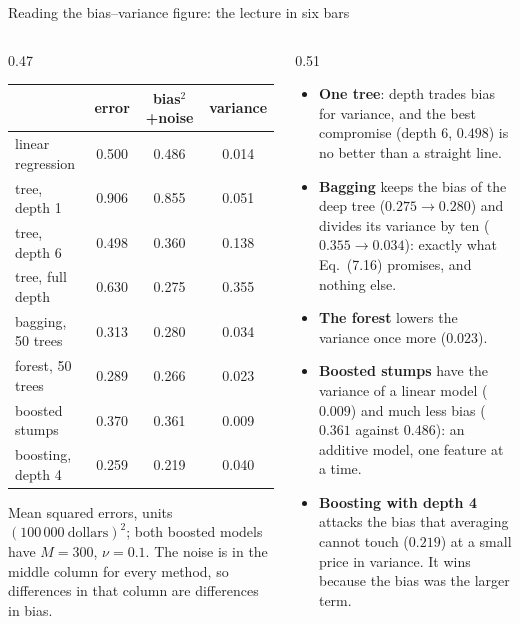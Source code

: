 \documentclass[10pt,aspectratio=169]{beamer}
\begin{document}
\begin{frame}{Reading the bias--variance figure: the lecture in six bars}
\begin{columns}[T]
\begin{column}{0.47\textwidth}
\scriptsize
\setlength{\tabcolsep}{4pt}
\begin{tabular}{@{}lccc@{}}
\toprule
 & error & bias$^2$+noise & variance\\
\midrule
linear regression & 0.500 & 0.486 & 0.014\\
tree, depth 1 & 0.906 & 0.855 & 0.051\\
tree, depth 6 & 0.498 & 0.360 & 0.138\\
tree, full depth & 0.630 & 0.275 & 0.355\\
\midrule
bagging, 50 trees & 0.313 & 0.280 & 0.034\\
forest, 50 trees & 0.289 & 0.266 & 0.023\\
\midrule
boosted stumps & 0.370 & 0.361 & 0.009\\
boosting, depth 4 & 0.259 & 0.219 & 0.040\\
\bottomrule
\end{tabular}

\medskip
\footnotesize
Mean squared errors, units $(100\,000\ \text{dollars})^2$; both
boosted models have $M=300$, $\nu=0.1$.  The noise is in
the middle column for every method, so differences in that column are
differences in bias.
\end{column}
\begin{column}{0.51\textwidth}
\footnotesize
\begin{itemize}
  \item \textbf{One tree}: depth trades bias for variance, and the best
    compromise (depth 6, $0.498$) is no better than a straight line.
  \item \textbf{Bagging} keeps the bias of the deep tree ($0.275\to0.280$)
    and divides its variance by ten ($0.355\to0.034$): exactly what
    Eq.\ (7.16) promises, and nothing else.
  \item \textbf{The forest} lowers the variance once more ($0.023$).
  \item \textbf{Boosted stumps} have the variance of a linear model
    ($0.009$) and much less bias ($0.361$ against $0.486$): an additive
    model, one feature at a time.
  \item \textbf{Boosting with depth 4} attacks the bias that averaging
    cannot touch ($0.219$) at a small price in variance.  It wins because
    the bias was the larger term.
\end{itemize}
\end{column}
\end{columns}
\end{frame}
\end{document}
